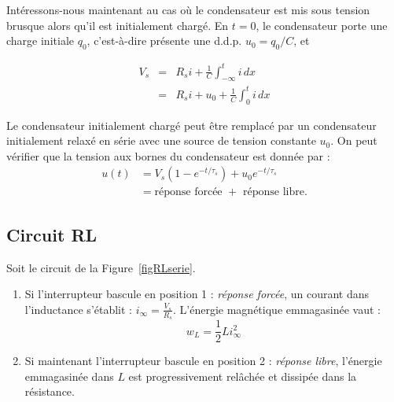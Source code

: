 Intéressons-nous maintenant au cas où le condensateur est mis sous tension brusque alors qu'il est initialement chargé.
En $t=0$, le condensateur porte une charge initiale
$q_0$, c'est-à-dire présente une d.d.p. $u_0=q_0/C$, et 
\begin{marginfigure}
\centering

\caption{Partie gauche de la figure \ref{fig:rcserie}.}
\end{marginfigure}
\begin{eqnarray*}
	V_s & =& R_si+\frac{1}{C}\int_{-\infty}^t i\,  dx\\
	& = & R_s i+u_0+\frac{1}{C}\int_{0}^t i\,  dx
\end{eqnarray*}
\begin{marginfigure}
\centering

\caption{Modélisation d'un condensateur initialement chargé.}
\end{marginfigure}
Le condensateur initialement chargé peut être remplacé par un
condensateur initialement relaxé en série avec une source de tension
constante $u_0$.
On peut vérifier que la tension aux bornes du condensateur est donnée par :
\begin{align*}
	u(t) & = V_s(1- e^{-t/\tau_s}) + u_0 e^{-t/\tau_s} \\ 
	&= \text{réponse forcée~}+ \text{~réponse libre}.
\end{align*}


\subsection{Circuit RL}

\begin{marginfigure}
\centering

\caption{Circuit illustrant les réponses forcées et libres d'un circuit RL.}
\label{figRLserie}
\end{marginfigure}
Soit le circuit de la Figure~\ref{figRLserie}.
\begin{enumerate}
	\item Si l'interrupteur bascule en position 1 : {\em réponse forcée}, un
	courant dans l'inductance s'établit : $i_{\infty}=\frac{V_s}{R_s}$. L'énergie
	magnétique emmagasinée vaut :
	\[w_L=\frac{1}{2}Li_{\infty}^2\]
	\item Si maintenant l'interrupteur bascule en position 2 : {\em réponse libre}, l'énergie
	emmagasinée dans $L$ est progressivement relâchée et dissipée dans la
	résistance.
\end{enumerate}


